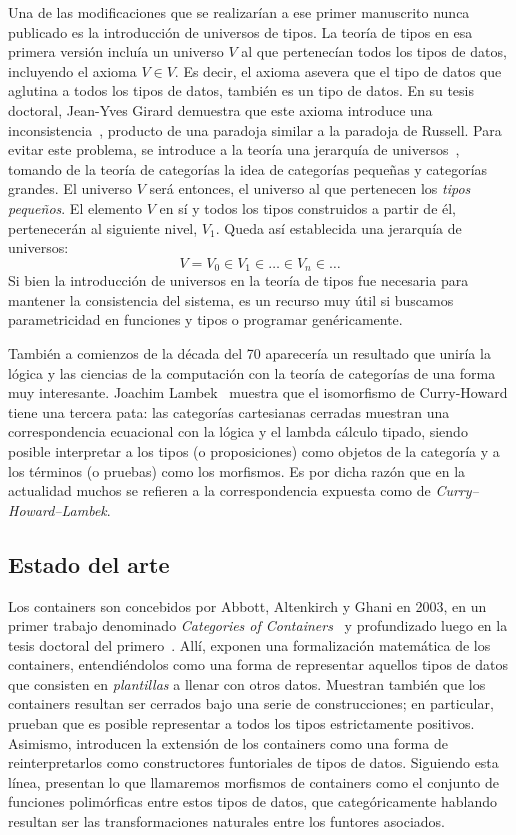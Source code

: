 Una de las modificaciones que se realizarían a ese primer manuscrito nunca publicado es la introducción de universos de tipos.
La teoría de tipos en esa primera versión incluía un universo $V$ al que pertenecían todos los tipos de datos, incluyendo el axioma $V \in V$. Es decir, el axioma asevera que el tipo de datos que aglutina a todos los tipos de datos, también es un tipo de datos.  En su tesis doctoral, Jean-Yves Girard demuestra que este axioma introduce una inconsistencia~, producto de una paradoja similar a la paradoja de Russell. Para evitar este problema, se introduce a la teoría una jerarquía de universos~, tomando de la teoría de categorías la idea de categorías pequeñas y categorías grandes. El universo $V$ será entonces, el universo al que pertenecen los {\it tipos pequeños}. El elemento $V$ en sí y todos los tipos construidos a partir de él, pertenecerán al siguiente nivel, $V_1$. Queda así establecida una jerarquía de universos: $$V = V_0 \in V_1 \in \ldots \in V_n \in \ldots$$
Si bien la introducción de universos en la teoría de tipos fue necesaria para mantener la consistencia del sistema, es un recurso muy útil si buscamos parametricidad en funciones y tipos o programar genéricamente.

También a comienzos de la década del 70 aparecería un resultado que uniría la lógica y las ciencias de la computación con la teoría de categorías de una forma muy interesante. Joachim Lambek~ muestra que el isomorfismo de Curry-Howard tiene una tercera pata: las categorías cartesianas cerradas muestran una correspondencia ecuacional con la lógica y el lambda cálculo tipado, siendo posible interpretar a los tipos (o proposiciones) como objetos de la categoría y a los términos (o pruebas) como los morfismos.
Es por dicha razón que en la actualidad muchos se refieren a la correspondencia expuesta como de {\it Curry–Howard–Lambek}.


\subsection*{Estado del arte}

Los containers son concebidos por Abbott, Altenkirch y Ghani en 2003, en un primer trabajo denominado {\it Categories of Containers}~\cite{abbott:2003} y profundizado luego en la tesis doctoral del primero~\cite{abbott:thesis}. Allí, exponen una formalización matemática de los containers, entendiéndolos como una forma de representar aquellos tipos de datos que consisten en {\it plantillas} a llenar con otros datos. Muestran también que los containers resultan ser cerrados bajo una serie de construcciones; en particular, prueban que es posible representar a todos los tipos estrictamente positivos. Asimismo, introducen la extensión de los containers como una forma de reinterpretarlos como constructores funtoriales de tipos de datos. Siguiendo esta línea, presentan lo que llamaremos morfismos de containers como el conjunto de funciones polimórficas entre estos tipos de datos, que categóricamente hablando resultan ser las transformaciones naturales entre los funtores asociados.

